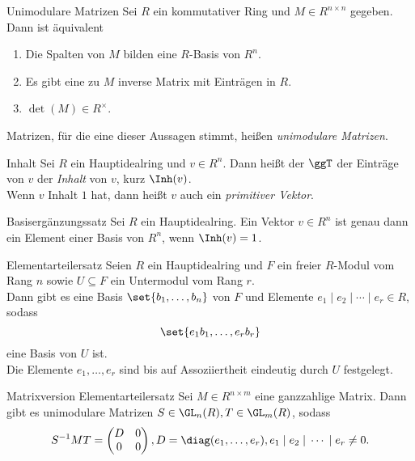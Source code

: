 \begin{karte}{Unimodulare Matrizen}
    Sei \(R\) ein kommutativer Ring und \(M \in R^{n\times n}\) gegeben. 
    Dann ist äquivalent
    \begin{enumerate}
        \item Die Spalten von \(M\) bilden eine \(R\)-Basis von \(R^n\).
        \item Es gibt eine zu \(M\) inverse Matrix mit Einträgen in \(R\).
        \item \(\det(M) \in R^\times\).
    \end{enumerate}
    Matrizen, für die eine dieser Aussagen stimmt, heißen \textit{unimodulare Matrizen}.
\end{karte}

\begin{karte}{Inhalt}
    Sei \(R\) ein Hauptidealring und \(v\in R^n\). Dann heißt der \(\ggT\)
    der Einträge von \(v\) der \textit{Inhalt} von \(v\), kurz \(\Inh(v)\).\\
    Wenn \(v\) Inhalt \(1\) hat, dann heißt \(v\) auch ein \textit{primitiver Vektor}.
\end{karte}

\begin{karte}{Basisergänzungssatz}
    Sei \(R\) ein Hauptidealring. Ein Vektor \(v\in R^n\) ist genau dann 
    ein Element einer Basis von \(R^n\), wenn \(\Inh(v) = 1\).
\end{karte}

\begin{karte}{Elementarteilersatz}
    Seien \(R\) ein Hauptidealring und \(F\) ein freier \(R\)-Modul 
    vom Rang \(n\) sowie \(U \subseteq F\) ein Untermodul vom Rang \(r\).\\
    Dann gibt es eine Basis \(\set{ b_1, \ldots, b_n }\) von \(F\) und 
    Elemente \( e_1 \;|\; e_2 \;|\; \cdots \;|\; e_r \in R \), 
    sodass 
    \[ \set{ e_1 b_1, \ldots, e_r b_r } \] 
    eine Basis von \(U\) ist.\\
    Die Elemente \(e_1, \ldots, e_r\) sind bis auf Assoziiertheit 
    eindeutig durch \(U\) festgelegt. 
\end{karte}

\begin{karte}{Matrixversion Elementarteilersatz}
    Sei \(M\in R^{n\times m}\) eine ganzzahlige Matrix. Dann gibt es unimodulare
    Matrizen \(S \in \GL_n(R), T\in \GL_m(R)\), sodass 
    \[ S^{-1} M T = \begin{pmatrix}
        D & 0 \\ 0 & 0
    \end{pmatrix}, D = \diag(e_1, \ldots, e_r), e_1 \;|\; e_2 \;|\; \cdots \;|\; e_r \neq 0. \]
\end{karte}

